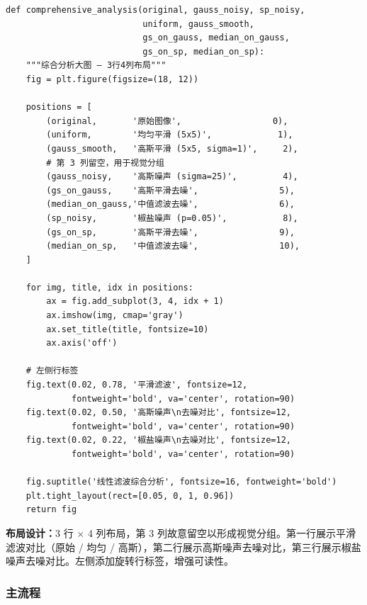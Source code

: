\documentclass[12pt,a4paper]{ctexart}
\begin{document}
\begin{lstlisting}[caption={综合分析 3$\times$4 子图布局}, label=lst:analysis]
def comprehensive_analysis(original, gauss_noisy, sp_noisy,
                           uniform, gauss_smooth,
                           gs_on_gauss, median_on_gauss,
                           gs_on_sp, median_on_sp):
    """综合分析大图 — 3行4列布局"""
    fig = plt.figure(figsize=(18, 12))

    positions = [
        (original,       '原始图像',                  0),
        (uniform,        '均匀平滑 (5x5)',             1),
        (gauss_smooth,   '高斯平滑 (5x5, sigma=1)',     2),
        # 第 3 列留空，用于视觉分组
        (gauss_noisy,    '高斯噪声 (sigma=25)',         4),
        (gs_on_gauss,    '高斯平滑去噪',                5),
        (median_on_gauss,'中值滤波去噪',                6),
        (sp_noisy,       '椒盐噪声 (p=0.05)',           8),
        (gs_on_sp,       '高斯平滑去噪',                9),
        (median_on_sp,   '中值滤波去噪',                10),
    ]

    for img, title, idx in positions:
        ax = fig.add_subplot(3, 4, idx + 1)
        ax.imshow(img, cmap='gray')
        ax.set_title(title, fontsize=10)
        ax.axis('off')

    # 左侧行标签
    fig.text(0.02, 0.78, '平滑滤波', fontsize=12,
             fontweight='bold', va='center', rotation=90)
    fig.text(0.02, 0.50, '高斯噪声\n去噪对比', fontsize=12,
             fontweight='bold', va='center', rotation=90)
    fig.text(0.02, 0.22, '椒盐噪声\n去噪对比', fontsize=12,
             fontweight='bold', va='center', rotation=90)

    fig.suptitle('线性滤波综合分析', fontsize=16, fontweight='bold')
    plt.tight_layout(rect=[0.05, 0, 1, 0.96])
    return fig
\end{lstlisting}

\textbf{布局设计：}3 行 $\times$ 4 列布局，第 3 列故意留空以形成视觉分组。第一行展示平滑滤波对比（原始 / 均匀 / 高斯），第二行展示高斯噪声去噪对比，第三行展示椒盐噪声去噪对比。左侧添加旋转行标签，增强可读性。

\subsubsection*{主流程}
\end{document}

